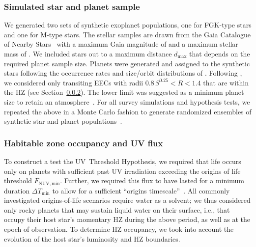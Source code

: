 \documentclass[twocolumn,twocolappendix,linenumbers]{aastex631}
\begin{document}
\subsubsection{Simulated star and planet sample}
We generated two sets of synthetic exoplanet populations, one for FGK-type stars and one for M-type stars.
The stellar samples are drawn from the Gaia Catalogue of Nearby Stars~\citep{Smart2021} with a maximum Gaia magnitude of  and a maximum stellar mass of  \SI{}{\Msun}.
We included stars out to a maximum distance $d_{\max}$ that depends on the required planet sample size.
Planets were generated and assigned to the synthetic stars following the occurrence rates and size/orbit distributions of \citet{Bergsten2022}.
Following \citet{Bixel2021}, we considered only transiting \glspl{EEC} with radii $0.8\, S^{0.25} < R < 1.4 $ that are within the \gls{HZ} (see Section~\ref{sec:met-hz}).
The lower limit was suggested as a minimum planet size to retain an atmosphere~\citep{Zahnle2017}.
For all survey simulations and hypothesis tests, we repeated the above in a Monte Carlo fashion to generate randomized ensembles of synthetic star and planet populations~\citep[][]{Bixel2021}.



\subsubsection{Habitable zone occupancy and UV flux}\label{sec:met-hz}
To construct a test  the UV~Threshold Hypothesis, we required that life occurs only on planets with sufficient past \gls{UV} irradiation exceeding the origins of life threshold $F_\mathrm{NUV, min}$.
Further, we required this flux to have lasted for a minimum duration $\Delta T_\mathrm{min}$ to allow for a sufficient ``origins timescale''~\citep{Rimmer2023}.
All commonly investigated origins-of-life scenarios require water as a solvent;
we thus considered only rocky planets that may sustain liquid water on their surface, i.e., that occupy their host star's momentary \gls{HZ} during the above period, as well as at the epoch of observation.
To determine \gls{HZ} occupancy, we took into account the evolution of the host star's luminosity and \gls{HZ} boundaries.
\end{document}
